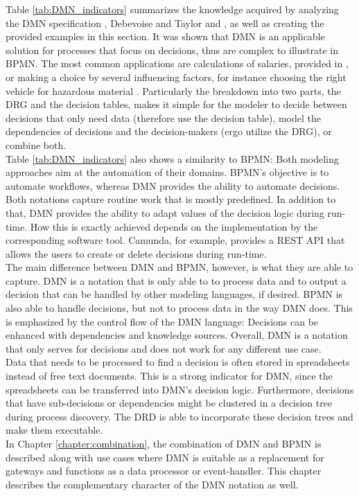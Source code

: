 Table \ref{tab:DMN_indicators} summarizes the knowledge acquired by analyzing the DMN specification \cite{DMNspec2016}, Debevoise and Taylor \cite{DMNmicroguide} and \cite{BiardMauffBigandEtAl2015a}, as well as creating the provided examples in this section. It was shown that DMN is an applicable solution for processes that focus on decisions, thus are complex to illustrate in BPMN. The most common applications are calculations of salaries, provided in \cite{DMNspec2016}, or making a choice by several influencing factors, for instance choosing the right vehicle for hazardous material \cite{DMNmicroguide}. Particularly the breakdown into two parts, the \acl{DRG} and the decision tables, makes it simple for the modeler to decide between decisions that only need data (therefore use the decision table), model the dependencies of decisions and the decision-makers (ergo utilize the \ac{DRG}), or combine both. \\
Table \ref{tab:DMN_indicators} also shows a similarity to BPMN: Both modeling approaches aim at the automation of their domains. BPMN's objective is to automate workflows, whereas DMN provides the ability to automate decisions. Both notations capture routine work that is mostly predefined. In addition to that, DMN provides the ability to adapt values of the decision logic during run-time. How this is exactly achieved depends on the implementation by the corresponding software tool. Camunda, for example, provides a \ac{REST} API that allows the users to create or delete decisions during run-time. \\
The main difference between DMN and BPMN, however, is what they are able to capture. DMN is a notation that is only able to to process data and to output a decision that can be handled by other modeling languages, if desired. BPMN is also able to handle decisions, but not to process data in the way DMN does. \newpage This is emphasized by the control flow of the DMN language: Decisions can be enhanced with dependencies and knowledge sources. Overall, DMN is a notation that only serves for decisions and does not work for any different use case. \\
Data that needs to be processed to find a decision is often stored in spreadsheets instead of free text documents. This is a strong indicator for DMN, since the spreadsheets can be transferred into DMN's decision logic. Furthermore, decisions that have sub-decisions or dependencies might be clustered in a decision tree during process discovery. The \ac{DRD} is able to incorporate these decision trees and make them executable. \\
In Chapter \ref{chapter:combination}, the combination of DMN and BPMN is described along with use cases where DMN is suitable as a replacement for gateways and functions as a data processor or event-handler. This chapter describes the complementary character of the DMN notation as well.



